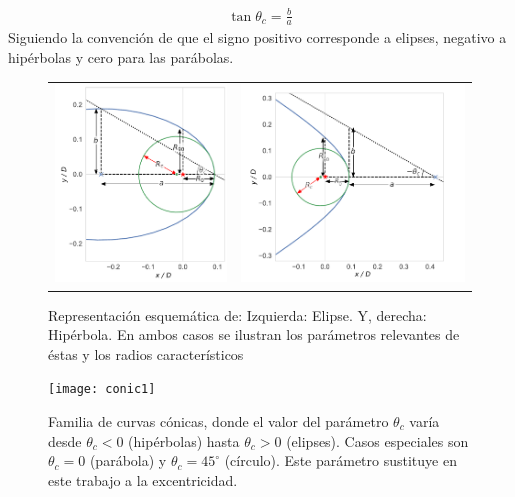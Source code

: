 \begin{align}
  \tan\theta_c = \frac{b}{a}
\end{align}
Siguiendo la convención de que el signo positivo corresponde a elipses, negativo a
hipérbolas y cero para las parábolas.

\begin{figure}
  \begin{tabular}{cc}
    \includegraphics[width=0.5\linewidth]{./Figures/ellipse_edited} &
    \includegraphics[width=0.5\linewidth]{./Figures/hyperbola_edited}
  \end{tabular}
  \label{fig:conics}
  \caption{Representación esquemática de: Izquierda: Elipse. Y, derecha: Hipérbola.
  En ambos casos se ilustran los parámetros relevantes de éstas y los radios característicos}
\end{figure}

\begin{figure}
  \texttt{[image: conic1]}
  \label{fig:conics-family}
  \caption{Familia de curvas cónicas, donde el valor del parámetro $\theta_c$ varía desde
    $\theta_c <0$ (hipérbolas) hasta $\theta_c > 0$ (elipses). Casos especiales son $\theta_c = 0$
  (parábola) y $\theta_c = 45^\circ$ (círculo). Este parámetro sustituye en este trabajo a la excentricidad.}
\end{figure}

